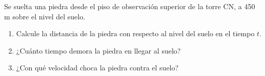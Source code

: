 \item Se suelta una piedra desde el piso de observación superior de la torre CN, a 450 m sobre el nivel del suelo.
\begin{enumerate}
    \item[(a)] Calcule la distancia de la piedra con respecto al nivel del suelo en el tiempo $t$.
    \item[(b)] ¿Cuánto tiempo demora la piedra en llegar al suelo?
    \item[(c)] ¿Con qué velocidad choca la piedra contra el suelo?
\end{enumerate}
